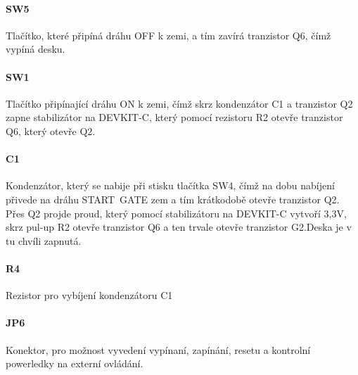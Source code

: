 \documentclass{template/socthesis}
\begin{document}
\begin{itemize}
	\paragraph*{SW5}
	Tlačítko, které připíná dráhu OFF k zemi, a tím zavírá tranzistor Q6, čímž vypíná desku.
	
	\paragraph*{SW1}
	Tlačítko připínající dráhu ON k zemi, čímž skrz kondenzátor C1 a tranzistor Q2 zapne stabilizátor na DEVKIT-C, který pomocí rezistoru R2 otevře tranzistor Q6, který otevře Q2. 
	
	\paragraph*{C1}
	Kondenzátor, který se nabije při stisku tlačítka SW4, čímž na dobu nabíjení přivede na dráhu START~GATE zem a tím krátkodobě otevře tranzistor Q2. Přes Q2 projde proud, který pomocí stabilizátoru na DEVKIT-C vytvoří 3,3V, skrz pul-up R2 otevře tranzistor Q6 a ten trvale otevře tranzistor G2.Deska je v tu chvíli zapnutá.
	
	\paragraph*{R4}
	Rezistor pro vybíjení kondenzátoru C1
	
	\paragraph*{JP6}
	Konektor, pro možnost vyvedení vypínaní, zapínání, resetu 
	a kontrolní powerledky na externí ovládání.
	

\end{itemize}
\end{document}
